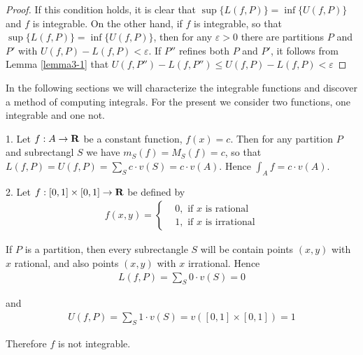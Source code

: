 \begin{proof}
    If this condition holds, it is clear that $\sup\{L(f,P)\} = \inf \{U(f, P)\}$ and 
    $f$ is integrable. On the other hand, if $f$ is integrable, so that $\sup\{L(f,P)\} = \inf \{U(f, P)\}$,
    then for any $\varepsilon>0$ there are partitions $P$ and $P'$ with $U(f, P)-L(f,P)<\varepsilon$. If 
    $P''$ refines both $P$ and $P'$, it follows from Lemma \ref{lemma3-1} that $U(f, P'')-L(f, P'')
    \le U(f, P)-L(f, P)<\varepsilon$
\end{proof}

In the following sections we will characterize the integrable
functions and discover a method of computing integrals.
For the present we consider two functions, one integrable and one not.

1. Let $f:A\to \mathbf{R}$ be a constant function, $f(x)=c$. Then for any partition
$P$ and subrectangl $S$ we have $m_S(f) = M_S(f) = c$, so that $L(f, P) = U(f, P)
= \sum_{S}^{}{c\cdot v(S)} = c\cdot v(A)$. Hence $\int_{A  }^{}{f} = c\cdot v(A)$.

2. Let $f:[0, 1]\times [0, 1]\to \mathbf{R}$ be defined by 
\begin{align*}
    f(x, y) =
    \left\{\begin{aligned}
        & 0, \text{ if $x$ is rational} \\
        & 1, \text{ if $x$ is irrational} 
    \end{aligned}\right.
\end{align*}

If $P$ is a partition, then every subrectangle $S$ will be contain points
$(x, y)$ with $x$ rational, and also points $(x, y)$ with $x$ irrational.
Hence 
\begin{align*}
    L(f, P) = \sum_{S  }^{}{0\cdot v(S)} = 0
\end{align*}

and 
\begin{align*}
    U(f, P) = \sum_{S  }^{}{1\cdot v(S)} = v([0, 1]\times [0, 1]) = 1 
\end{align*}

Therefore $f$ is not integrable. 

